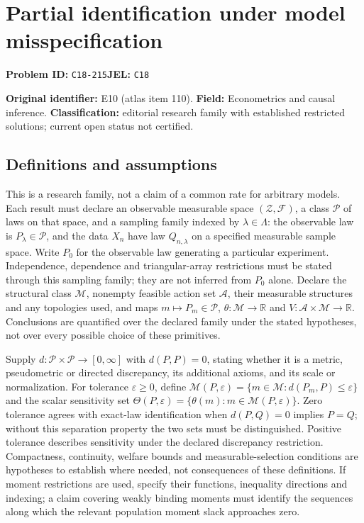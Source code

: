 \documentclass[11pt,a4paper]{article}
\newcommand{\R}{\mathbb R}
\begin{document}
\section*{Partial identification under model misspecification}
\textbf{Problem ID:} \texttt{C18-215}\quad \textbf{JEL:} \texttt{C18}\par
\label{problem:OP-0110}
\label{atlas:prob:E10}

\noindent\textbf{Original identifier:} E10 (atlas item 110). \textbf{Field:} Econometrics and causal inference. \textbf{Classification:} editorial research family with established restricted solutions; current open status not certified.

\subsection*{Definitions and assumptions}

This is a research family, not a claim of a common rate for arbitrary models. Each result must declare an observable measurable space $(\mathcal Z,\mathcal F)$, a class $\mathscr P$ of laws on that space, and a sampling family indexed by $\lambda\in\Lambda$: the observable law is $P_\lambda\in\mathscr P$, and the data $X_n$ have law $Q_{n,\lambda}$ on a specified measurable sample space. Write $P_0$ for the observable law generating a particular experiment. Independence, dependence and triangular-array restrictions must be stated through this sampling family; they are not inferred from $P_0$ alone. Declare the structural class $\mathcal M$, nonempty feasible action set $\mathcal A$, their measurable structures and any topologies used, and maps $m\mapsto P_m\in\mathscr P$, $\theta:\mathcal M\to\R$ and $V:\mathcal A\times\mathcal M\to\R$. Conclusions are quantified over the declared family under the stated hypotheses, not over every possible choice of these primitives.

Supply $d:\mathscr P\times\mathscr P\to[0,\infty]$ with $d(P,P)=0$, stating whether it is a metric, pseudometric or directed discrepancy, its additional axioms, and its scale or normalization. For tolerance $\varepsilon\ge0$, define $\mathcal M(P,\varepsilon)=\{m\in\mathcal M:d(P_m,P)\le\varepsilon\}$ and the scalar sensitivity set $\Theta(P,\varepsilon)=\{\theta(m):m\in\mathcal M(P,\varepsilon)\}$. Zero tolerance agrees with exact-law identification when $d(P,Q)=0$ implies $P=Q$; without this separation property the two sets must be distinguished. Positive tolerance describes sensitivity under the declared discrepancy restriction. Compactness, continuity, welfare bounds and measurable-selection conditions are hypotheses to establish where needed, not consequences of these definitions. If moment restrictions are used, specify their functions, inequality directions and indexing; a claim covering weakly binding moments must identify the sequences along which the relevant population moment slack approaches zero.
\end{document}
